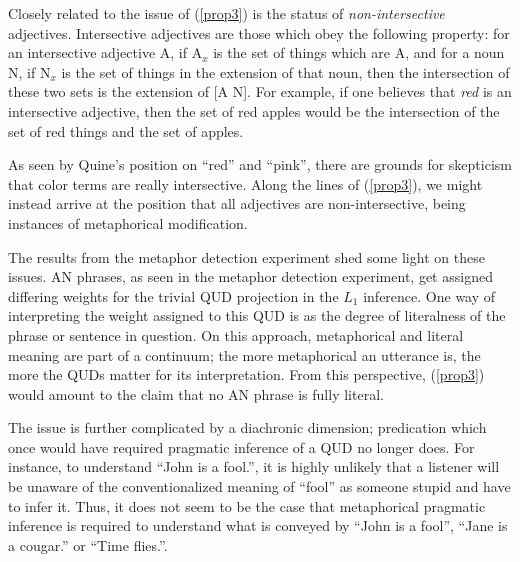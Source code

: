 \documentclass[10pt,letterpaper,twocolumn]{article}
\begin{document}
Closely related to the issue of (\ref{prop3}) is the status of \emph{non-intersective} adjectives. Intersective adjectives are those which obey the following property: for an intersective adjective A, if A$_x$ is the set of things which are A, and for a noun N, if N$_x$ is the set of things in the extension of that noun, then the intersection of these two sets is the extension of [A N]. For example, if one believes that \emph{red} is an intersective adjective, then the set of red apples would be the intersection of the set of red things and the set of apples.

As seen by Quine's position on ``red'' and ``pink'', there are grounds for skepticism that color terms are really intersective. Along the lines of (\ref{prop3}), we might instead arrive at the position that all adjectives are non-intersective, being instances of metaphorical modification.

The results from the metaphor detection experiment shed some light on these issues. AN phrases, as seen in the metaphor detection experiment, get assigned differing weights for the trivial QUD projection in the $L_1$ inference. One way of interpreting the weight assigned to this QUD is as the degree of literalness of the phrase or sentence in question. On this approach, metaphorical and literal meaning are part of a continuum; the more metaphorical an utterance is, the more the QUDs matter for its interpretation. From this perspective, (\ref{prop3}) would amount to the claim that no AN phrase is fully literal.

The issue is further complicated by a diachronic dimension; predication which once would have required pragmatic inference of a QUD no longer does. For instance, to understand ``John is a fool.'', it is highly unlikely that a listener will be unaware of the conventionalized meaning of ``fool'' as someone stupid and have to infer it. Thus, it does not seem to be the case that metaphorical pragmatic inference is required to understand what is conveyed by ``John is a fool'', ``Jane is a cougar.'' or ``Time flies.''.  


\end{document}
